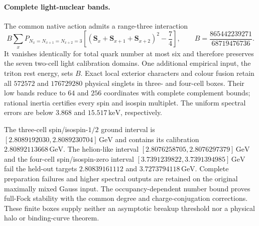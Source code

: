 \paragraph{Complete light-nuclear bands.}
The common native action admits a range-three interaction
\[
 B\sum_x P_{N_x=N_{x+1}=N_{x+2}=3}
 \left[(\mathbf S_x+\mathbf S_{x+1}+\mathbf S_{x+2})^2-\frac74\right],
 \qquad B=\frac{865442239271}{68719476736}.
\]
It vanishes identically for total quark number at most six and therefore
preserves the seven two-cell light calibration domains. One additional
empirical input, the triton rest energy, sets $B$. Exact local exterior
characters and colour fusion retain all $572572$ and $176729280$ physical
singlets in three- and four-cell boxes. Their low bands reduce to $64$
and $256$ coordinates with complete complement bounds; rational inertia
certifies every spin and isospin multiplet. The uniform spectral errors
are below $3.868$ and $15.517\,\mathrm{keV}$, respectively.

The three-cell spin/isospin-$1/2$ ground interval is
$[2.8089192030,2.8089230704]\,\mathrm{GeV}$ and contains its calibration
$2.80892113668\,\mathrm{GeV}$. The helion-like interval
$[2.8076258705,2.8076297379]\,\mathrm{GeV}$ and the four-cell
spin/isospin-zero interval
$[3.7391239822,3.7391394985]\,\mathrm{GeV}$ fail the held-out targets
$2.80839161112$ and $3.7273794118\,\mathrm{GeV}$. Complete preparation
failures and higher spectral outputs are retained on the original
maximally mixed Gauss input. The occupancy-dependent number bound proves
full-Fock stability with the common degree and charge-conjugation
corrections. These finite boxes supply neither an asymptotic breakup
threshold nor a physical halo or binding-curve theorem.
